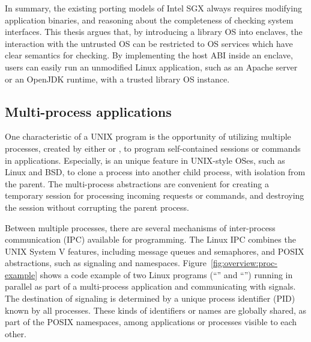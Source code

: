In summary, the existing porting models of Intel SGX always requires modifying application binaries, and reasoning about the completeness of checking system interfaces.
This thesis argues that, by introducing a library OS into enclaves,
the interaction with the untrusted OS can be restricted to OS services which have clear semantics for checking.
By implementing the host ABI inside an enclave,
users can easily run an unmodified Linux application, such as an Apache server or an OpenJDK runtime,
with a trusted \graphene{} library OS instance.



\subsection{Multi-process applications}
\label{sec:intro:multiproc}


One characteristic of a UNIX program is the opportunity of utilizing multiple processes, created by either  or ,
to program self-contained sessions or commands in applications.
Especially,  is an unique feature in UNIX-style OSes, such as Linux and BSD,
to clone a process into another child process, with isolation from the parent.
The multi-process abstractions are convenient for creating a temporary session for processing incoming requests or commands, and destroying the session without corrupting the parent process.

Between multiple processes, there are several mechanisms of inter-process communication (IPC)  available for programming.
The Linux IPC combines the UNIX System V features, including message queues and semaphores,
and POSIX abstractions, such as signaling and namespaces.
Figure~\ref{fig:overview:proc-example} shows a code example of
two Linux programs (``'' and ``'')
running in parallel as part of a multi-process application and communicating with signals.
The destination of signaling is determined by a unique process identifier (PID)
known by all processes.
These kinds of identifiers or names are globally shared, as part of the POSIX namespaces,
among applications or processes visible to each other.

